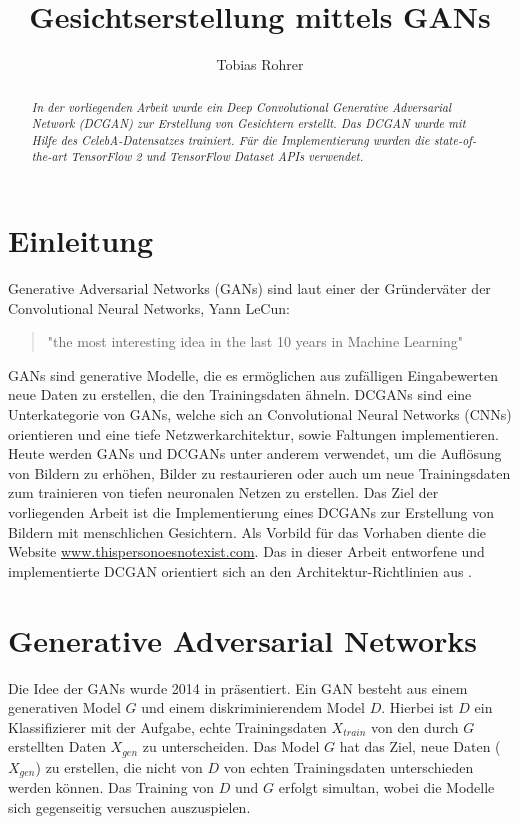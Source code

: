 \documentclass[twocolumn,10pt]{asme2ej}
\title{Gesichtserstellung mittels GANs}
\author{Tobias Rohrer
    \affiliation{
	Hochschule Darmstadt\\
	Data Science (Master)\\
    Email: sttorohr@stud.h-da.de
    }	
}
\begin{document}
\maketitle    

\begin{abstract}
{\it In der vorliegenden Arbeit wurde ein Deep Convolutional Generative Adversarial Network (DCGAN) zur Erstellung von Gesichtern erstellt. Das DCGAN wurde mit Hilfe des CelebA-Datensatzes trainiert. Für die Implementierung wurden die state-of-the-art TensorFlow 2 und TensorFlow Dataset APIs verwendet.
}
\end{abstract}

\section{Einleitung}
Generative Adversarial Networks (GANs) \cite{goodfellow2014generative} sind laut einer der Gründerväter der Convolutional Neural Networks, Yann LeCun: \begin{quote}
"the most interesting idea in the last 10 years in Machine Learning"
\end{quote}
GANs sind generative Modelle, die es ermöglichen aus zufälligen Eingabewerten neue Daten zu erstellen, die den Trainingsdaten ähneln. DCGANs sind eine Unterkategorie von GANs, welche sich an Convolutional Neural Networks (CNNs) orientieren und eine tiefe Netzwerkarchitektur, sowie Faltungen implementieren. Heute werden GANs und DCGANs unter anderem verwendet, um die Auflösung von Bildern zu erhöhen, Bilder zu restaurieren oder auch um neue Trainingsdaten zum trainieren von tiefen neuronalen Netzen zu erstellen. Das Ziel der vorliegenden Arbeit ist die Implementierung eines DCGANs zur Erstellung von Bildern mit menschlichen Gesichtern. Als Vorbild für das Vorhaben diente die Website \url{www.thispersonoesnotexist.com}. Das in dieser Arbeit entworfene und implementierte DCGAN orientiert sich an den Architektur-Richtlinien aus \cite{radford2015unsupervised}.

\section{Generative Adversarial Networks}
Die Idee der GANs wurde 2014 in \cite{goodfellow2014generative} präsentiert. Ein GAN besteht aus einem generativen Model $G$ und einem diskriminierendem Model $D$. Hierbei ist $D$ ein Klassifizierer mit der Aufgabe, echte Trainingsdaten $X_{train}$ von den durch $G$ erstellten Daten $X_{gen}$ zu unterscheiden.  Das Model $G$ hat das Ziel, neue Daten ($X_{gen}$) zu erstellen, die nicht von $D$ von echten Trainingsdaten unterschieden werden können. Das Training von $D$ und $G$ erfolgt simultan, wobei die Modelle sich gegenseitig versuchen auszuspielen.
\end{document}
